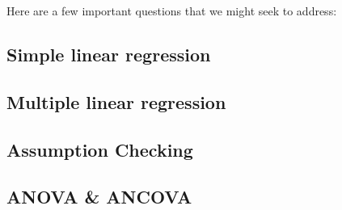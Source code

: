 Here are a few important questions that we might seek to address:
\subsection{Simple linear regression}

\subsection{Multiple linear regression}

\subsection{Assumption Checking}

\subsection{ANOVA \& ANCOVA}

